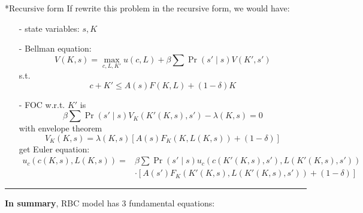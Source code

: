 \documentclass[10pt,landscape,a4paper]{article}
\makeatletter
\renewcommand{\subsubsection}{\@startsection{subsubsection}{1}{0mm}{.2ex}{.2ex}{\bfseries}}
\makeatother
\begin{document}
\begin{multicols*}{3}
\vspace{2pt}
\subsubsection*{Recursive form}
If rewrite this problem in the recursive form, we would have:
\begin{itemize}
    \item[-] state variables: $s,K$
    \item[-] Bellman equation:
    $$
    V(K,s)=\max_{c,L,K'}u(c,L)+\beta \sum\Pr(s'\mid s)V(K',s')
    $$
    s.t.
    $$
    c+K'\leq A(s)F(K,L)+(1-\delta)K
    $$
    \item[-] FOC w.r.t. $K'$ is
    $$
    \beta \sum \Pr(s'\mid s)V_K(K'(K,s),s')-\lambda(K,s)=0
    $$
    with envelope theorem
    $$
    V_K(K,s)=\lambda(K,s)\left[ A(s)F_K(K,L(K,s))+(1-\delta) \right]
    $$
    get Euler equation:
    \begin{align*}
        u_c(c(K,s),L(K,s)) =& \beta\sum\Pr(s'\mid s)u_c(c(K'(K,s),s'),L(K'(K,s),s'))\\
        &\cdot \left[ A(s')F_K\left(K'(K,s),L(K'(K,s),s')\right)+(1-\delta) \right]
    \end{align*}
    
\end{itemize}

\rule{0.238\textwidth}{0.4pt}
\vspace{1pt}

\textbf{In summary}, RBC model has 3 fundamental equations:



\end{multicols*}
\end{document}
